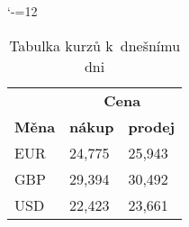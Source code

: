 \documentclass[a4paper, 11pt]{article}
\begin{document}
\bigskip
\begin{table}[h]
\catcode`-=12
\centering
\begin{tabular}{|l|ll|}
\hline
\multicolumn{1}{|c|}{\textbf{}} & \multicolumn{2}{c|}{\textbf{Cena}}                    \\ \cline{2-3} 
\textbf{Měna}                   & \multicolumn{1}{l|}{\textbf{nákup}} & \textbf{prodej} \\ \hline
EUR                             & \multicolumn{1}{l|}{24,775}         & 25,943          \\
GBP                             & \multicolumn{1}{l|}{29,394}         & 30,492          \\
USD                             & \multicolumn{1}{l|}{22,423}         & 23,661          \\ \hline
\end{tabular}
\caption{Tabulka kurzů k~dnešnímu dni}\label{tab:meny}
\end{table}
\end{document}
